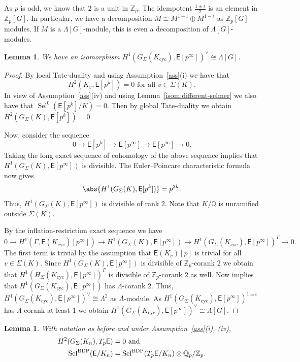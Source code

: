 \documentclass{amsart}
\newtheorem{lemma}[theorem]{Lemma}
\numberwithin{equation}{section}
\theoremstyle{remark}
\newcommand{\cyc}{\operatorname{cyc}}
\newcommand{\Sel}{\operatorname{Sel}}
\newcommand{\SelBDP}{\operatorname{Sel}^{\textup{BDP}}}
\newcommand{\Z}{\mathbb{Z}}
\newcommand{\Q}{\mathbb{Q}}
\newcommand{\EC}{\mathsf{E}}
\theoremstyle{plain} %
\begin{document}
As $p$ is odd, we know that $2$ is a unit in $\Z_p$.
The idempotent $\frac{1\pm \iota}{2}$ is an element in $\Z_p[G]$.
In particular, we have a decomposition $M\cong M^{1+\iota}\oplus M^{1-\iota}$ as $\Z_p[G]$-modules.
If $M$ is a $\Lambda[G]$-module, this is even a decomposition of $\Lambda[G]$-modules.

\begin{lemma}
\label{global}
We have an isomorphism $H^1(G_\Sigma(K_{\cyc}),\EC[p^\infty])^\vee\cong \Lambda[G]$.
\end{lemma}

\begin{proof}
By local Tate-duality and using Assumption~\ref{ass}(i) we have that
\[
H^2(K_v,\EC[p^k])=0 \text{ for all } v\in \Sigma(K).
\]
In view of Assumption~\ref{ass}(iv) and using Lemma~\ref{isom:different-selmer} we also have that $\Sel^0(\EC[p^k]/K)=0$.
Then by global Tate-duality we obtain $H^2(G_\Sigma(K),\EC[p^k])=0$.

Now, consider the sequence
\[
0 \longrightarrow \EC[p^k] \longrightarrow \EC[p^\infty] \longrightarrow \EC[p^\infty] \longrightarrow 0.
\]
Taking the long exact sequence of cohomology of the above sequence implies that $H^1(G_\Sigma(K), \EC[p^\infty])$ is divisible.
The Euler--Poincare characteristic formula now gives \cite[Equation 27]{greenberg}
\[
\abs{H^1(G_\Sigma(K),\EC[p^k])}=p^{2k}.
\]
Thus, $H^1(G_\Sigma(K),\EC[p^\infty])$ is divisible of rank $2$.
Note that $K/\Q$ is unramified outside $\Sigma(K)$.

By the inflation-restriction exact sequence we have
\[
0 \longrightarrow H^1(\Gamma, \EC(K_{\cyc})[p^\infty]) \longrightarrow H^1(G_{\Sigma}(K),\EC[p^\infty]) \longrightarrow H^1(G_{\Sigma}(K_{\cyc}), \EC[p^\infty])^{\Gamma} \longrightarrow 0.
\]
The first term is trivial by the assumption that $\EC(K_v)[p]$ is trivial for all $v\in \Sigma(K)$.
Since $H^1(G_\Sigma(K),\EC[p^\infty])$ is divisible of $\Z_p$-corank $2$ we obtain that $H^1(H_\Sigma(K_{\cyc}),\EC[p^\infty])^{\Gamma}$ is divisible of $\Z_p$-corank $2$ as well.
Now \cite[Proposition~3]{greenberg} implies that $H^1(G_\Sigma(K_{\cyc}),\EC[p^\infty])$ has $\Lambda$-corank 2.
Thus, $H^1(G_\Sigma(K_{\cyc}),\EC[p^\infty])^\vee\cong \Lambda^2$ as $\Lambda$-module.
As $H^1(G_\Sigma(K_{\cyc}),\EC[p^\infty])^{1\pm \iota}$ has $\Lambda$-corank at least 1 we obtain $H^1(G_\Sigma(K_{\cyc}),\EC[p^\infty])^\vee\cong \Lambda[G]$.
\end{proof}

\begin{lemma}
\label{lem.div}
With notation as before and under Assumption~\ref{ass}\textup{(}i\textup{)}, \textup{(}iv\textup{)},
\begin{align*}
H^2({G_{\Sigma}}(K_n),T_p\EC)&=0 \textrm{ and}\\ \SelBDP(\EC/K_n)&=\SelBDP(T_p\EC/K_n)\otimes \Q_p/\Z_p.
\end{align*}
\end{lemma}
\end{document}
